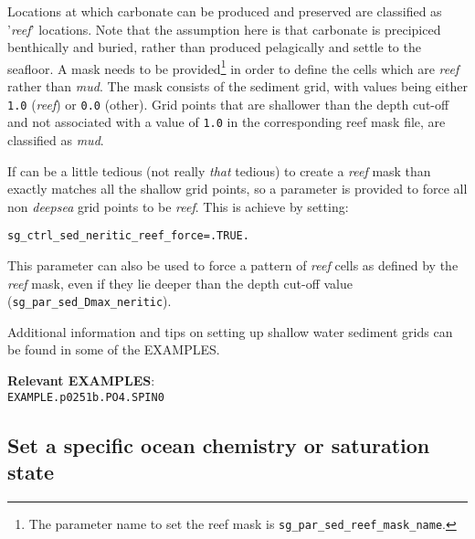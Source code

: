 \documentclass[10pt,twoside]{article}
\begin{document}
Locations at which  carbonate can be produced and preserved
are classified
as '\textit{reef}' locations. Note that the assumption here is that carbonate is precipiced benthically and buried, rather than produced pelagically and  settle to the seafloor.
A mask needs to be provided\footnote{The parameter name to set the reef mask is \texttt{sg\_par\_sed\_reef\_mask\_name}.} in order to define the cells which are \textit{reef} rather than \textit{mud}. The mask consists of the sediment grid, with values being either \texttt{1.0} (\textit{reef}) or \texttt{0.0} (other).  Grid points that are shallower than the depth cut-off and not associated with a value of \texttt{1.0} in the corresponding reef mask file, are classified as \textit{mud}.

If can be a little tedious (not really \textit{that} tedious) to create a \textit{reef} mask than exactly matches
all the shallow grid points, so a parameter is provided to force all non \textit{deepsea} grid points to be \textit{reef}. This is achieve by setting:
\vspace{-5pt}\begin{verbatim}
sg_ctrl_sed_neritic_reef_force=.TRUE.
\end{verbatim}\vspace{-5pt}
This parameter can also be used to force a pattern of \textit{reef} cells as defined by the \textit{reef} mask, even if they lie deeper than the depth cut-off value (\texttt{sg\_par\_sed\_Dmax\_neritic}).

Additional information and tips on setting up shallow water sediment grids can be found in some of the EXAMPLES.

\noindent \textbf{Relevant EXAMPLES}:\\\texttt{EXAMPLE.p0251b.PO4.SPIN0}


\subsection{Set a specific ocean chemistry or saturation state}\label{set_saturation}
\end{document}

